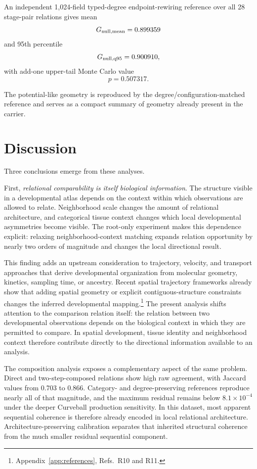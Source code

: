 \documentclass[11pt]{article}
\begin{document}
An independent 1,024-field typed-degree endpoint-rewiring reference over all 28 stage-pair relations gives mean
\[
G_{\rm null,mean}=0.899359
\]
and 95th percentile
\[
G_{\rm null,q95}=0.900910,
\]
with add-one upper-tail Monte Carlo value
\[
p=0.507317.
\]

The potential-like geometry is reproduced by the degree/configuration-matched reference and serves as a compact summary of geometry already present in the carrier.

\section{Discussion}

Three conclusions emerge from these analyses.

First, \textit{relational comparability is itself biological information}. The structure visible in a developmental atlas depends on the context within which observations are allowed to relate. Neighborhood scale changes the amount of relational architecture, and categorical tissue context changes which local developmental asymmetries become visible. The root-only experiment makes this dependence explicit: relaxing neighborhood-context matching expands relation opportunity by nearly two orders of magnitude and changes the local directional result.

This finding adds an upstream consideration to trajectory, velocity, and transport approaches that derive developmental organization from molecular geometry, kinetics, sampling time, or ancestry. Recent spatial trajectory frameworks already show that adding spatial geometry or explicit contiguous-structure constraints changes the inferred developmental mapping.\footnote{Appendix~\ref{app:references}, Refs.~R10 and R11.} The present analysis shifts attention to the comparison relation itself: the relation between two developmental observations depends on the biological context in which they are permitted to compare. In spatial development, tissue identity and neighborhood context therefore contribute directly to the directional information available to an analysis.

The composition analysis exposes a complementary aspect of the same problem. Direct and two-step-composed relations show high raw agreement, with Jaccard values from 0.703 to 0.866. Category- and degree-preserving references reproduce nearly all of that magnitude, and the maximum residual remains below \(8.1\times10^{-4}\) under the deeper Curveball production sensitivity. In this dataset, most apparent sequential coherence is therefore already encoded in local relational architecture. Architecture-preserving calibration separates that inherited structural coherence from the much smaller residual sequential component.
\end{document}
